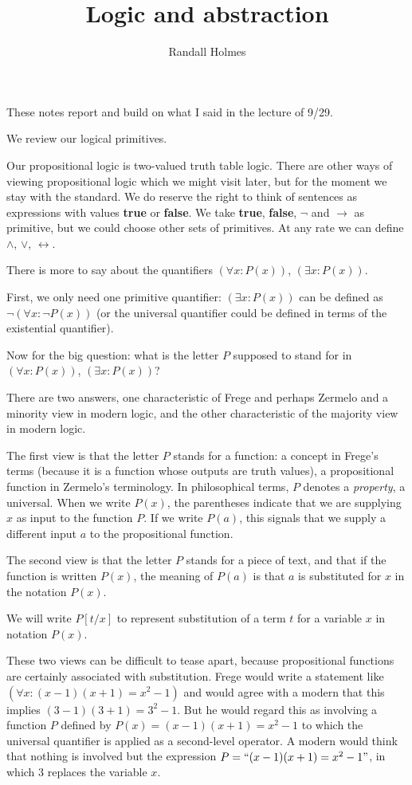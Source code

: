 \documentclass[12pt]{article}
\title{Logic and abstraction}
\author{Randall Holmes}
\begin{document}
\maketitle

These notes report and build on what I said in the lecture of 9/29.

We review our logical primitives.

Our propositional logic is two-valued truth table logic.  There are other ways of viewing propositional logic which we might visit later, but for the moment we stay with the standard.  We do reserve the right to think of sentences as expressions with values {\bf true} or {\bf false}.  We take {\bf true}, {\bf false}, $\neg$ and $\rightarrow$ as primitive, but we could choose other sets of primitives.  At any rate we can define $\wedge$, $\vee$, $\leftrightarrow$.

There is more to say about the quantifiers $(\forall x:P(x))$, $(\exists x:P(x))$.

First, we only need one primitive quantifier:  $(\exists x:P(x))$ can be defined as $\neg(\forall x:\neg P(x))$ (or the universal quantifier could be defined in terms of the existential quantifier).

Now for the big question:  what is the letter $P$ supposed to stand for in $(\forall x:P(x))$, $(\exists x:P(x))$?

There are two answers, one characteristic of Frege and perhaps Zermelo and a minority view in modern logic, and the other characteristic of the majority view in modern logic.

The first view is that the letter $P$ stands for a function:  a concept in Frege's terms (because it is a function whose outputs are truth values), a propositional function in Zermelo's terminology.  In philosophical terms, $P$ denotes a {\em property\/}, a universal.
When we write $P(x)$, the parentheses indicate that we are supplying $x$ as input to the function $P$.  If we write $P(a)$, this signals that we supply a different input $a$ to the propositional function.

The second view is that the letter $P$ stands for a piece of text, and that if the function is written $P(x)$, the meaning of $P(a)$ is that $a$ is substituted for $x$ in the notation $P(x)$.

We will write $P[t/x]$ to represent substitution of a term $t$ for a variable $x$ in notation $P(x)$.

These two views can be difficult to tease apart, because propositional functions are certainly associated with substitution.  Frege would write a statement like $(\forall x:(x-1)(x+1)=x^2-1)$
and would agree with a modern that this implies $(3-1)(3+1) = 3^2-1$.  But he would regard this as involving a function $P$ defined by $P(x) = (x-1)(x+1)=x^2-1$ to which the universal quantifier is applied as a second-level operator.  A modern would think that nothing is involved but the expression $P = ``(x-1)(x+1)=x^2-1"$, in which 3 replaces the variable $x$.
\end{document}
